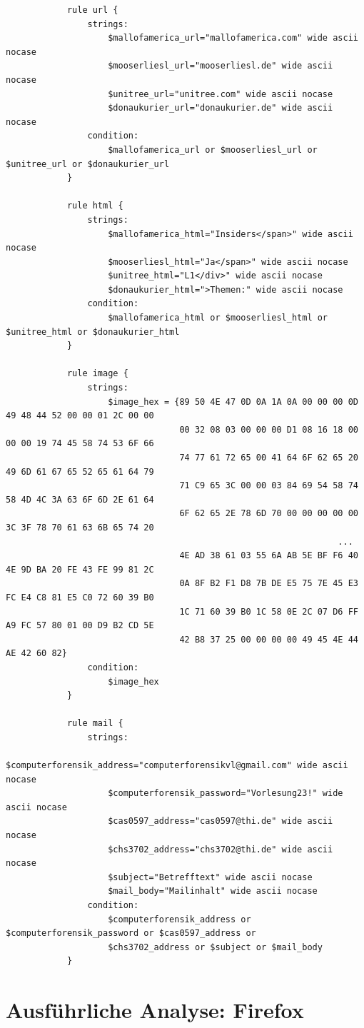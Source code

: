 \begin{appendices}
\begin{landscape}
\begin{multicols}{2}
\begin{verbatim}
			rule url {
				strings:
					$mallofamerica_url="mallofamerica.com" wide ascii nocase
					$mooserliesl_url="mooserliesl.de" wide ascii nocase
					$unitree_url="unitree.com" wide ascii nocase
					$donaukurier_url="donaukurier.de" wide ascii nocase	
				condition:
					$mallofamerica_url or $mooserliesl_url or $unitree_url or $donaukurier_url
			}
			
			rule html {
				strings:			
					$mallofamerica_html="Insiders</span>" wide ascii nocase
					$mooserliesl_html="Ja</span>" wide ascii nocase
					$unitree_html="L1</div>" wide ascii nocase
					$donaukurier_html=">Themen:" wide ascii nocase		
				condition:
					$mallofamerica_html or $mooserliesl_html or $unitree_html or $donaukurier_html
			}
			
			rule image {
				strings:
					$image_hex = {89 50 4E 47 0D 0A 1A 0A 00 00 00 0D 49 48 44 52 00 00 01 2C 00 00 
								  00 32 08 03 00 00 00 D1 08 16 18 00 00 00 19 74 45 58 74 53 6F 66 
								  74 77 61 72 65 00 41 64 6F 62 65 20 49 6D 61 67 65 52 65 61 64 79 
								  71 C9 65 3C 00 00 03 84 69 54 58 74 58 4D 4C 3A 63 6F 6D 2E 61 64 
								  6F 62 65 2E 78 6D 70 00 00 00 00 00 3C 3F 78 70 61 63 6B 65 74 20 
																 ...
								  4E AD 38 61 03 55 6A AB 5E BF F6 40 4E 9D BA 20 FE 43 FE 99 81 2C 
								  0A 8F B2 F1 D8 7B DE E5 75 7E 45 E3 FC E4 C8 81 E5 C0 72 60 39 B0 
								  1C 71 60 39 B0 1C 58 0E 2C 07 D6 FF A9 FC 57 80 01 00 D9 B2 CD 5E 
								  42 B8 37 25 00 00 00 00 49 45 4E 44 AE 42 60 82}
				condition:
					$image_hex
			}
			
			rule mail {
				strings:		
					$computerforensik_address="computerforensikvl@gmail.com" wide ascii nocase
					$computerforensik_password="Vorlesung23!" wide ascii nocase
					$cas0597_address="cas0597@thi.de" wide ascii nocase
					$chs3702_address="chs3702@thi.de" wide ascii nocase
					$subject="Betrefftext" wide ascii nocase
					$mail_body="Mailinhalt" wide ascii nocase	
				condition:
					$computerforensik_address or $computerforensik_password or $cas0597_address or 
					$chs3702_address or $subject or $mail_body
			}
		\end{verbatim}
\end{multicols}
\end{landscape}
\restoregeometry

\section{Ausführliche Analyse: Firefox}

\end{appendices}
